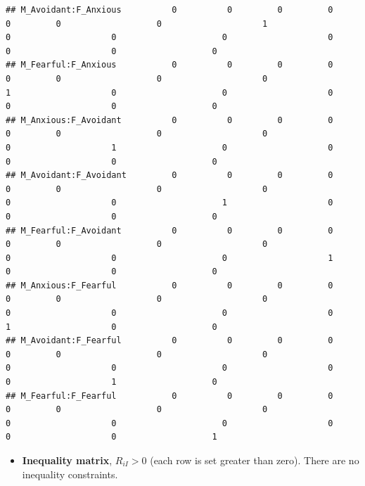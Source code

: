 \documentclass[
]{book}
\providecommand{\tightlist}{%
  \setlength{\itemsep}{0pt}\setlength{\parskip}{0pt}}
\begin{document}
\begin{verbatim}
## M_Avoidant:F_Anxious          0          0         0         0          0         0                   0                    1                   0                    0                     0                    0                   0                    0                   0
## M_Fearful:F_Anxious           0          0         0         0          0         0                   0                    0                   1                    0                     0                    0                   0                    0                   0
## M_Anxious:F_Avoidant          0          0         0         0          0         0                   0                    0                   0                    1                     0                    0                   0                    0                   0
## M_Avoidant:F_Avoidant         0          0         0         0          0         0                   0                    0                   0                    0                     1                    0                   0                    0                   0
## M_Fearful:F_Avoidant          0          0         0         0          0         0                   0                    0                   0                    0                     0                    1                   0                    0                   0
## M_Anxious:F_Fearful           0          0         0         0          0         0                   0                    0                   0                    0                     0                    0                   1                    0                   0
## M_Avoidant:F_Fearful          0          0         0         0          0         0                   0                    0                   0                    0                     0                    0                   0                    1                   0
## M_Fearful:F_Fearful           0          0         0         0          0         0                   0                    0                   0                    0                     0                    0                   0                    0                   1
\end{verbatim}

\begin{itemize}
\tightlist
\item
  \textbf{Inequality matrix}, \(R_{iI} > 0\) (each row is set greater than zero). There are no inequality constraints.
\end{itemize}
\end{document}
